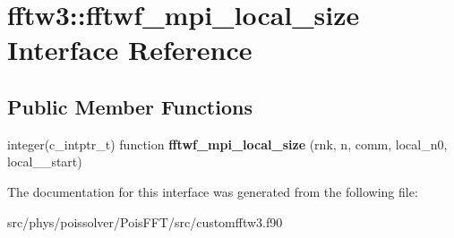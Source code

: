 \hypertarget{interfacefftw3_1_1fftwf__mpi__local__size}{}\section{fftw3\+:\+:fftwf\+\_\+mpi\+\_\+local\+\_\+size Interface Reference}
\label{interfacefftw3_1_1fftwf__mpi__local__size}
\subsection*{Public Member Functions}
\begin{DoxyCompactItemize}
\item 
integer(c\+\_\+intptr\+\_\+t) function {\bfseries fftwf\+\_\+mpi\+\_\+local\+\_\+size} (rnk, n, comm, local\+\_\+n0, local\+\_\+\_\+start)\hypertarget{interfacefftw3_1_1fftwf__mpi__local__size_ab44d5704341a9b21f530bf5f52d9c039}{}\label{interfacefftw3_1_1fftwf__mpi__local__size_ab44d5704341a9b21f530bf5f52d9c039}

\end{DoxyCompactItemize}


The documentation for this interface was generated from the following file\+:\begin{DoxyCompactItemize}
\item 
src/phys/poissolver/\+Pois\+F\+F\+T/src/customfftw3.\+f90\end{DoxyCompactItemize}
